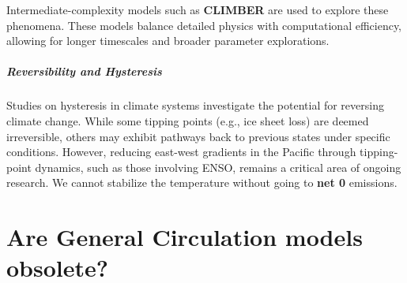 Intermediate-complexity models such as \textbf{CLIMBER} are used to explore these phenomena. These models balance detailed physics with computational efficiency, allowing for longer timescales and broader parameter explorations.

\paragraph{Reversibility and Hysteresis}

Studies on hysteresis in climate systems investigate the potential for reversing climate change. While some tipping points (e.g., ice sheet loss) are deemed irreversible, others may exhibit pathways back to previous states under specific conditions. However, reducing east-west gradients in the Pacific through tipping-point dynamics, such as those involving ENSO, remains a critical area of ongoing research.
We cannot stabilize the temperature without going to \textbf{net 0} emissions.

\chapter{Are General Circulation models obsolete?}